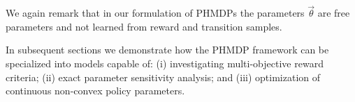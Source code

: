We again remark that in our formulation of PHMDPs the parameters {\footnotesize $ \vec{\theta} $} are free parameters and not learned from reward and transition samples.

In subsequent sections we demonstrate how the PHMDP framework can be specialized into models capable of: (i) investigating multi-objective reward criteria; (ii) exact parameter sensitivity analysis; and (iii) optimization of continuous non-convex policy parameters.

%
%
%

